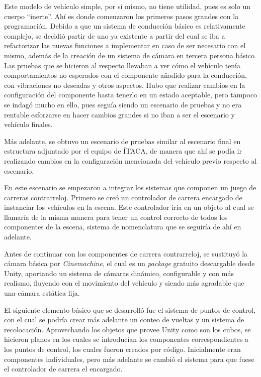 Este modelo de vehículo simple, por sí mismo, no tiene utilidad, pues es solo un cuerpo ``inerte''. Ahí es donde comenzaron los primeros pasos grandes con la programación. Debido a que un sistema de conducción básico es relativamente complejo, se decidió partir de uno ya existente a partir del cual se iba a refactorizar las nuevas funciones a implementar en caso de ser necesario con el mismo, además de la creación de un sistema de cámara en tercera persona básico. Las pruebas que se hicieron al respecto llevaban a ver cómo el vehículo tenía comportamientos no esperados con el componente añadido para la conducción, con vibraciones no deseadas y otros aspectos. Hubo que realizar cambios en la configuración del componente hasta tenerlo en un estado aceptable, pero tampoco se indagó mucho en ello, pues seguía siendo un escenario de pruebas y no era rentable esforzarse en hacer cambios grandes si no iban a ser el escenario y vehículo finales.

Más adelante, se obtuvo un escenario de pruebas similar al escenario final en estructura adjuntado por el equipo de ÍTACA, de manera que ahí se podía ir realizando cambios en la configuración mencionada del vehículo previo respecto al escenario. 

En este escenario se empezaron a integrar los sistemas que componen un juego de carreras contrarreloj. Primero se creó un controlador de carrera encargado de instanciar los vehículos en la escena. Este controlador iría en un objeto al cual se llamaría de la misma manera para tener un control correcto de todos los componentes de la escena, sistema de nomenclatura que se seguiría de ahí en adelante. 

Antes de continuar con los componentes de carrera contrarreloj, se sustituyó la cámara básica por \textit{Cinemachine}, el cual es un \textit{package} gratuito descargable desde Unity, aportando un sistema de cámaras dinámico, configurable y con más realismo, fluyendo con el movimiento del vehículo y siendo más agradable que una cámara estática fija.

El siguiente elemento básico que se desarrolló fue el sistema de puntos de control, con el cual se podría crear más adelante un conteo de vueltas y un sistema de recolocación. Aprovechando los objetos que provee Unity como son los cubos, se hicieron planos en los cuales se introducían los componentes correspondientes a los puntos de control, los cuales fueron creados por código. Inicialmente eran componentes individuales, pero más adelante se cambió el sistema para que fuese el controlador de carrera el encargado.

